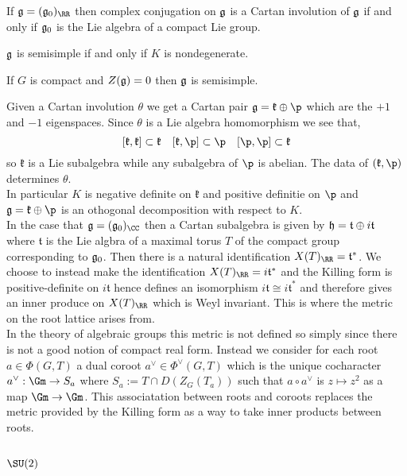\documentclass[12pt]{article}
\begin{document}
\begin{cor}
If $\g = (\g_0)_{\RR}$ then complex conjugation on $\mathfrak{g}$ is a Cartan involution of $\mathfrak{g}$ if and only if $\mathfrak{g}_0$ is the Lie algebra of a compact Lie group.
\end{cor}

\begin{theorem}[Cartan]
$\mathfrak{g}$ is semisimple if and only if $K$ is nondegenerate.
\end{theorem}

\begin{cor}
If $G$ is compact and $Z(\mathfrak{g}) = 0$ then $\mathfrak{g}$ is semisimple.
\end{cor}
\renewcommand{\t}{\mathfrak{t}}
\renewcommand{\k}{\mathfrak{k}}

Given a Cartan involution $\theta$ we get a Cartan pair $\g = \k \oplus \p$ which are the $+1$ and $-1$ eigenspaces. Since $\theta$ is a Lie algebra homomorphism we see that,
\[ [\k, \k] \subset \k \quad [\k, \p] \subset \p \quad [\p, \p] \subset \k \]
so $\k$ is a Lie subalgebra while any subalgebra of $\p$ is abelian. The data of $(\k, \p)$ determines $\theta$. 
\bigskip\\
In particular $K$ is negative definite on $\k$ and positive definitie on $\p$ and $\g = \k \oplus \p$ is an othogonal decomposition with respect to $K$. 
\bigskip\\
In the case that $\g = (\g_0)_{\CC}$ then a Cartan subalgebra is given by $\h = \t \oplus i \t$ where $\t$ is the Lie algbra of a maximal torus $T$ of the compact group corresponding to $\mathfrak{g}_0$. Then there is a natural identification $X(T)_{\RR} = \t^*$. We choose to instead make the identification $X(T)_{\RR} = i \t^*$ and the Killing form is positive-definite on $i \t$ hence defines an isomorphism $i \t \cong i \t^*$ and therefore gives an inner produce on $X(T)_{\RR}$ which is Weyl invariant. This is where the metric on the root lattice arises from. 
\bigskip\\
In the theory of algebraic groups this metric is not defined so simply since there is not a good notion of compact real form. Instead we consider for each root $a \in \Phi(G, T)$ a dual coroot $a^{\vee} \in \Phi^{\vee}(G, T)$ which is the unique cocharacter $a^{\vee} : \Gm \to S_a$ where $S_a := T \cap D(Z_G(T_a))$ such that $a \circ a^\vee$ is $z \mapsto z^2$ as a map $\Gm \to \Gm$. This associatation between roots and coroots replaces the metric provided by the Killing form as a way to take inner products between roots. 


\subsection{$\SU(2)$}
\end{document}
